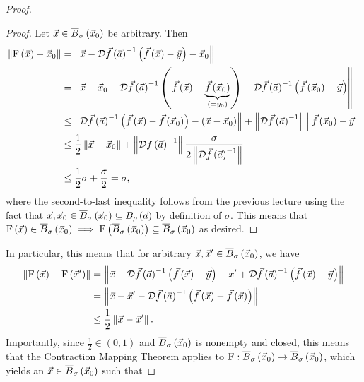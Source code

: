 \documentclass[main.tex]{subfiles}
\begin{document}
\begin{proof}
    \begin{proof}
        Let $\vec{x}\in \overline{B}_\sigma\left( \vec{x}_0 \right)$ be arbitrary. Then
        \begin{align*}
            \left\lVert \mathrm{F}\left( \vec{x} \right) - \vec{x}_0 \right\rVert &= \left\lVert \vec{x} - \mathcal{D}\vec{f}\left( \vec{a} \right)^{-1}\left( \vec{f}\left( \vec{x} \right) - \vec{y} \right) - \vec{x}_0 \right\rVert \\
            &= \left\lVert \vec{x} - \vec{x}_0 - \mathcal{D}\vec{f}\left( \vec{a} \right)^{-1}\left( \vec{f}\left( \vec{x} \right) - \underbrace{\vec{f}\left( \vec{x}_0 \right)}_{(= y_0)} \right) - \mathcal{D}\vec{f}\left( \vec{a} \right)^{-1}\left( \vec{f}\left( \vec{x}_0 \right) - \vec{y} \right) \right\rVert \\
            &\le \left\lVert \mathcal{D}\vec{f}\left( \vec{a} \right)^{-1}\left( \vec{f}\left( \vec{x} \right) - \vec{f}\left( \vec{x}_0 \right) \right) - \left( \vec{x} - \vec{x}_0 \right) \right\rVert + \left\lVert \mathcal{D}\vec{f}\left( \vec{a} \right)^{-1} \right\rVert\left\lVert \vec{f}\left( \vec{x}_0 \right) - \vec{y} \right\rVert \\
            &\le \frac{1}{2}\left\lVert \vec{x} - \vec{x}_0 \right\rVert + \left\lVert \mathcal{D}f\left( \vec{a} \right)^{-1} \right\rVert\frac{\sigma}{2\left\lVert \mathcal{D}\vec{f}\left( \vec{a} \right)^{-1} \right\rVert} \\
            &\le \frac{1}{2}\sigma + \frac{\sigma}{2} = \sigma, 
        \end{align*}
        where the second-to-last inequality follows from the previous lecture using the fact that $\vec{x}, \vec{x}_0\in \overline{B}_\sigma\left( \vec{x}_0 \right) \subseteq B_\rho\left( \vec{a} \right)$ by definition of $\sigma$. This means that $\mathrm{F}\left( \vec{x} \right) \in \overline{B}_\sigma\left( \vec{x}_0 \right)\implies \mathrm{F}\left( \overline{B}_\sigma\left( \vec{x}_0 \right) \right) \subseteq \overline{B}_\sigma\left( \vec{x}_0 \right)$ as desired.
    \end{proof}
    In particular, this means that for arbitrary $\vec{x}, \vec{x}'\in \overline{B}_\sigma\left( \vec{x}_0 \right)$, we have
    \begin{align*}
        \left\lVert \mathrm{F}\left( \vec{x} \right) - \mathrm{F}\left( \vec{x}' \right) \right\rVert &= \left\lVert \vec{x} - \mathcal{D}\vec{f}\left( \vec{a} \right)^{-1}\left( \vec{f}\left( \vec{x} \right) - \vec{y} \right) - x' + \mathcal{D}\vec{f}\left( \vec{a} \right)^{-1}\left( \vec{f}\left( \vec{x} \right) - \vec{y} \right) \right\rVert \\
        &= \left\lVert \vec{x} - \vec{x}' - \mathcal{D}\vec{f}\left( \vec{a} \right)^{-1}\left( \vec{f}\left( \vec{x} \right) - \vec{f}\left( \vec{x} \right) \right) \right\rVert \\
        &\le \frac{1}{2}\left\lVert \vec{x} - \vec{x}' \right\rVert.
    \end{align*}
    Importantly, since $\frac{1}{2}\in (0, 1)$ and $\overline{B}_\sigma\left( \vec{x}_0 \right)$ is nonempty and closed, this means that the Contraction Mapping Theorem applies to $\mathrm{F} : \overline{B}_\sigma\left( \vec{x}_0 \right) \to \overline{B}_\sigma\left( \vec{x}_0 \right)$, which yields an $\vec{x}\in \overline{B}_\sigma\left( \vec{x}_0 \right)$ such that

\end{proof}
\end{document}
